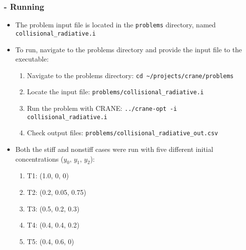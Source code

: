 \begin{frame}[fragile]
	\frametitle{\insertsubsectionhead \hspace{1pt} - Running}
		\begin{itemize}
			\item The problem input file is located in the \texttt{problems} directory, named \texttt{collisional\_radiative.i}
			\item To run, navigate to the problems directory and provide the input file to the executable:
			\begin{enumerate}
				\item Navigate to the problems directory: \newline
				\hspace*{8pt} \texttt{cd \textasciitilde/projects/crane/problems}
				\item Locate the input file: \newline
				\hspace*{8pt} \texttt{problems/collisional\_radiative.i}
				\item Run the problem with CRANE: \newline
				\hspace*{8pt} \texttt{../crane-opt -i collisional\_radiative.i}
				\item Check output files: \newline
				\hspace*{8pt} \texttt{problems/collisional\_radiative\_out.csv}
			\end{enumerate}
			\item Both the stiff and nonstiff cases were run with five different initial concentrations ($y_0$, $y_1$, $y_2$): 
			\begin{enumerate}
				\item T1: (1.0, 0, 0)
				\item T2: (0.2, 0.05, 0.75)
				\item T3: (0.5, 0.2, 0.3)
				\item T4: (0.4, 0.4, 0.2)
				\item T5: (0.4, 0.6, 0)
			\end{enumerate}
		\end{itemize}
\end{frame}


